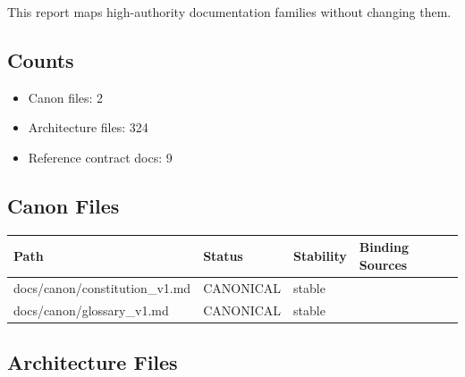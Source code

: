 \documentclass[10.5pt,a4paper,openany]{book}
\newcommand{\toprule}{\hline}
\newcommand{\midrule}{\hline}
\newcommand{\bottomrule}{\hline}
\begin{document}
This report maps high-\allowbreak{}authority documentation families without changing them.\allowbreak{}


\subsection{Counts}

\begin{itemize}
\item Canon files: 2
\item Architecture files: 324
\item Reference contract docs: 9
\end{itemize}

\subsection{Canon Files}

\begin{center}
{\small\renewcommand{\arraystretch}{1.18}
\begin{tabularx}{\linewidth}{@{}>{\raggedright\arraybackslash}X >{\raggedright\arraybackslash}X >{\raggedright\arraybackslash}X >{\raggedright\arraybackslash}X@{}}
\toprule
\textbf{Path} & \textbf{Status} & \textbf{Stability} & \textbf{Binding Sources} \\
\midrule
docs/\allowbreak{}canon/\allowbreak{}constitution\_\allowbreak{}v1.\allowbreak{}md & CANONICAL & stable &  \\
docs/\allowbreak{}canon/\allowbreak{}glossary\_\allowbreak{}v1.\allowbreak{}md & CANONICAL & stable &  \\
\bottomrule
\end{tabularx}
}
\end{center}


\subsection{Architecture Files}
\end{document}
